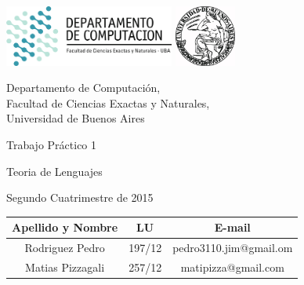 \documentclass[a4paper, 10pt, twoside]{article}
\begin{document}


\thispagestyle{caratula}

\begin{center}

\includegraphics[height=2cm]{DC.png}
\hfill
\includegraphics[height=2cm]{UBA.jpg}

\vspace{2cm}

Departamento de Computación,\\
Facultad de Ciencias Exactas y Naturales,\\
Universidad de Buenos Aires

\vspace{4cm}

\begin{Huge}
Trabajo Práctico 1
\end{Huge}

\vspace{0.5cm}

\begin{Large}
Teoria de Lenguajes
\end{Large}

\vspace{1cm}

Segundo Cuatrimestre de 2015

\vspace{4cm}

\begin{tabular}{|c|c|c|}
\hline
Apellido y Nombre & LU & E-mail\\
\hline
Rodriguez Pedro & 197/12 & pedro3110.jim@gmail.om \\
Matias Pizzagali & 257/12 & matipizza@gmail.com \\
\hline
\end{tabular}

\end{center}
\end{document}
